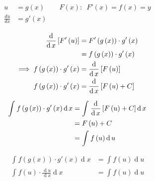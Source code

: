 \documentclass{report}
\def\lthtmlcheckvsize{\ifdim\ht\sizebox<\vsize 
  \ifdim\wd\sizebox<\hsize\expandafter\hfill\fi \expandafter\vfill
  \else\expandafter\vss\fi}%
\begin{document}
{\newpage\clearpage
{}%
\begin{align}
\begin{matrix}
u &= g(x) & \quad F(x): \enspace  F'(x) = f(x) = y \\
\frac{du}{dx} &= g'(x)
\end{matrix}
\end{align}%
\lthtmlfigureZ
\lthtmlcheckvsize\clearpage}

{\newpage\clearpage
{}%
\begin{align}
\frac{\operatorname{d} }{\operatorname{d} x}\left[ F'\left( u \right) \right]&= F'\left( g\left( x \right) \right)\cdot g'\left( x \right)\notag \\
&= f\left( g\left( x \right) \right)\cdot g'\left( x \right)\notag \\
 \implies  f\left( g\left( x \right) \right)\cdot g'\left( x \right)&= \frac{\operatorname{d} }{\operatorname{d} x}\left[ F\left( u \right) \right]\notag \\
 f\left( g\left( x \right) \right)\cdot g'\left( x \right)&= \frac{\operatorname{d} }{\operatorname{d} x}\left[ F\left( u \right) +C \right]\notag \\
\end{align}%
\lthtmlfigureZ
\lthtmlcheckvsize\clearpage}

{\newpage\clearpage
{}%
\begin{align}
\int^{}_{} f\left( g\left( x \right) \right)\cdot g'\left( x \right)  \operatorname{d}x &= \int^{}_{} \frac{\operatorname{d} }{\operatorname{d} x}\left[ F\left( u \right)+ C \right]  \operatorname{d}x \notag \\
&= F\left(u  \right) + C\notag \\
&= \int^{}_{} f\left( u \right)  \operatorname{d}u\notag  
\end{align}%
\lthtmlfigureZ
\lthtmlcheckvsize\clearpage}

{\newpage\clearpage
{}%
\begin{align}
\int^{}_{} f\left( g\left( x \right) \right)\cdot g'\left( x \right)  \operatorname{d}x &= \int^{}_{} f\left( u \right)  \operatorname{d}u
\\
\int^{}_{} f\left( u \right)\cdot \frac{\operatorname{d}u }{\operatorname{d} x}  \operatorname{d}x&= \int^{}_{} f\left( u \right)  \operatorname{d}u
\end{align}%
\lthtmlfigureZ
\lthtmlcheckvsize\clearpage}
\end{document}
